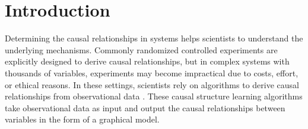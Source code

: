 \chapter{Introduction}

Determining the causal relationships in systems helps scientists to understand the underlying mechanisms. Commonly randomized controlled experiments are explicitly designed to derive causal relationships, but in complex systems with thousands of variables, experiments may become impractical due to costs, effort, or ethical reasons. In these settings, scientists rely on algorithms to derive causal relationships from observational data \cite{pearlCausality2009,spirtesCausationPredictionSearch1993,neapolitanLearningBayesianNetworks2003,pearlProbabilisticReasoningIntelligent1988}. 
These causal structure learning algorithms take observational data as input and output the causal relationships between variables in the form of a graphical model.



